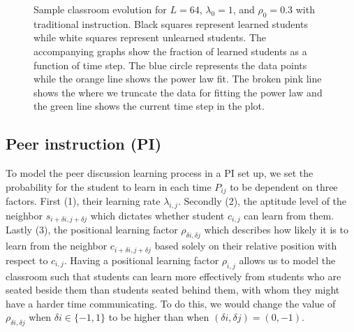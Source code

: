 \begin{figure}[htbp!]

    \caption[Example classroom evolution for the homogenous traditional instruction set up]{Sample classroom evolution for $L=64$, $\lambda_0 = 1$, and $\rho_0 = 0.3$ with traditional instruction. 
    Black squares represent learned students while white squares represent unlearned students. 
    The accompanying graphs show the fraction of learned students as a function of time step. 
    The blue circle represents the data points while the orange line shows the power law fit. 
    The broken pink line shows the where we truncate the data for fitting the power law and the green line shows the current time step in the plot.
    }
    \label{fig:2DBPCA traditional classroom evolution}
 \end{figure}

 \newpage

\subsection{Peer instruction (PI)}
To model the peer discussion learning process in a PI set up, we set the probability for the student to learn in each time $P_{ij}$ to be dependent on three factors.
First (1), their learning rate $\lambda_{i,j}$. 
Secondly (2), the aptitude level of the neighbor $s_{i+\delta i, j+\delta j}$ which dictates whether student $c_{i,j}$ can learn from them.
Lastly (3), the positional learning factor $\rho_{\delta i, \delta j}$ which describes how likely it is to learn from the neighbor $c_{i+\delta i, j+\delta j}$ based solely on their relative position with respect to $c_{i,j}$.
Having a positional learning factor $\rho_{i,j}$ allows us to model the classroom such that students can learn more effectively from students who are seated beside them than students seated behind them, with whom they might have a harder time communicating.
To do this, we would change the value of $\rho_{\delta i, \delta j}$ when $\delta i \in \lbrace -1,1 \rbrace$ to be higher than when $(\delta i, \delta j) = (0, -1)$.

